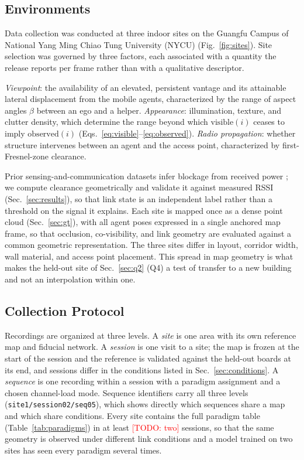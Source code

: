 \documentclass[journal]{IEEEtran}
\newcommand{\todo}[1]{\textcolor{red}{[TODO: #1]}}
\begin{document}
\subsection{Environments}
\label{sec:environments}
Data collection was conducted at three indoor sites on the Guangfu
Campus of National Yang Ming Chiao Tung University (NYCU)
(Fig.~\ref{fig:sites}). Site selection was governed by three factors,
each associated with a quantity the release reports per frame rather
than with a qualitative descriptor.

\textit{Viewpoint}: the availability of an elevated, persistent
vantage and its attainable lateral displacement from the mobile
agents, characterized by the range of aspect angles $\beta$ between an
ego and a helper. \textit{Appearance}: illumination, texture, and
clutter density, which determine the range beyond which
$\mathrm{visible}(i)$ ceases to imply $\mathrm{observed}(i)$
(Eqs.~\eqref{eq:visible}--\eqref{eq:observed}). \textit{Radio
propagation}: whether structure intervenes between an agent and the
access point, characterized by first-Fresnel-zone clearance.

Prior sensing-and-communication datasets infer blockage from received
power \cite{deepsense6g}; we compute clearance geometrically and
validate it against measured RSSI (Sec.~\ref{sec:results}), so that
link state is an independent label rather than a threshold on the
signal it explains. Each site is mapped once as a dense point cloud
(Sec.~\ref{sec:gt}), with all agent poses expressed in a single
anchored map frame, so that occlusion, co-visibility, and link
geometry are evaluated against a common geometric representation.
The three sites differ in layout, corridor width, wall material, and
access point placement. This spread in map geometry is what makes the
held-out site of Sec.~\ref{sec:q2} (Q4) a test of transfer to a new
building and not an interpolation within one.



\subsection{Collection Protocol}
\label{sec:protocol}
Recordings are organized at three levels. A \emph{site} is one area
with its own reference map and fiducial network. A \emph{session} is
one visit to a site; the map is frozen at the start of the session
and the reference is validated against the held-out boards at its
end, and sessions differ in the conditions listed in
Sec.~\ref{sec:conditions}. A \emph{sequence} is one recording within
a session with a paradigm assignment and a chosen channel-load mode.
Sequence identifiers carry all three levels
(\texttt{site1/session02/seq05}), which shows directly which
sequences share a map and which share conditions. Every site
contains the full paradigm table (Table~\ref{tab:paradigms}) in at
least \todo{two} sessions, so that the same geometry is observed
under different link conditions and a model trained on two sites has
seen every paradigm several times.
\end{document}
